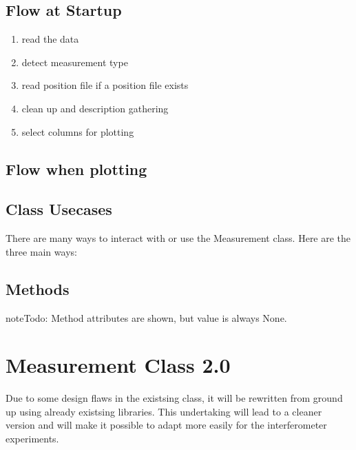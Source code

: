 \documentclass[letterpaper,10pt,english]{sphinxmanual}
\begin{document}
\section{Flow at Startup}
\label{\detokenize{measurement:flow-at-startup}}\begin{enumerate}
\def\theenumi{\arabic{enumi}}
\def\labelenumi{\theenumi .}
\makeatletter\def\p@enumii{\p@enumi \theenumi .}\makeatother
\item {} 
read the data

\item {} 
detect measurement type

\item {} 
read position file if a position file exists

\item {} 
clean up and description gathering

\item {} 
select columns for plotting

\end{enumerate}


\section{Flow when plotting}
\label{\detokenize{measurement:flow-when-plotting}}

\section{Class Usecases}
\label{\detokenize{measurement:class-usecases}}
There are many ways to interact with or use the Measurement class. Here are the three main ways:


\section{Methods}
\label{\detokenize{measurement:methods}}
\begin{sphinxadmonition}{note}{\label{measurement:index-0}Todo:}
Method attributes are shown, but value is always None.
\end{sphinxadmonition}


\chapter{Measurement Class 2.0}
\label{\detokenize{measurement2:measurement-class-2-0}}\label{\detokenize{measurement2::doc}}
Due to some design flaws in the existsing  class, it will be rewritten from ground up using already existsing libraries. This undertaking will lead to a cleaner version and will make it possible to adapt  more easily for the interferometer experiments.
\end{document}
